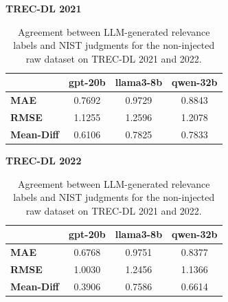 \begin{table}[t]
    \centering
    \caption{Agreement between LLM-generated relevance labels and NIST judgments for the non-injected raw dataset on TREC-DL 2021 and 2022.}
    \label{tab:metrics_raw}
    \setlength{\tabcolsep}{3.5pt}
    \footnotesize
    \textbf{TREC-DL 2021} \\
    \vspace{0.2em}
    \begin{tabular}{lccc}
    \toprule
    & \textbf{gpt-20b} & \textbf{llama3-8b} & \textbf{qwen-32b} \\
    \midrule
    \textbf{MAE} & 0.7692 & 0.9729 & 0.8843 \\
    \textbf{RMSE} & 1.1255 & 1.2596 & 1.2078 \\
    \textbf{Mean-Diff} & 0.6106 & 0.7825 & 0.7833 \\
    \bottomrule
    \end{tabular}
    \vspace{2em}

    \textbf{TREC-DL 2022} \\
    \vspace{0.2em}
    \begin{tabular}{lccc}
    \toprule
    & \textbf{gpt-20b} & \textbf{llama3-8b} & \textbf{qwen-32b} \\
    \midrule
    \textbf{MAE} & 0.6768 & 0.9751 & 0.8377 \\
    \textbf{RMSE} & 1.0030 & 1.2456 & 1.1366 \\
    \textbf{Mean-Diff} & 0.3906 & 0.7586 & 0.6614 \\
    \bottomrule
    \end{tabular}
\end{table}